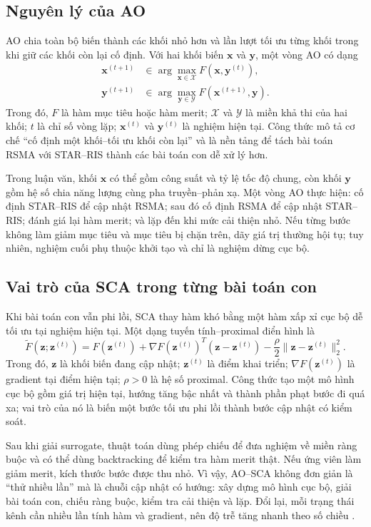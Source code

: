 \subsection{Nguyên lý của AO}
AO chia toàn bộ biến thành các khối nhỏ hơn và lần lượt tối ưu từng khối trong khi giữ các khối còn lại cố định. Với hai khối biến $\bm x$ và $\bm y$, một vòng AO có dạng
\begin{align}
 \bm x^{(t+1)}&\in\arg\max_{\bm x\in\mathcal X}F(\bm x,\bm y^{(t)}),\\
 \bm y^{(t+1)}&\in\arg\max_{\bm y\in\mathcal Y}F(\bm x^{(t+1)},\bm y).
 \label{eq:ch1-ao-update}
\end{align}
Trong đó, $F$ là hàm mục tiêu hoặc hàm merit; $\mathcal X$ và $\mathcal Y$ là miền khả thi của hai khối; $t$ là chỉ số vòng lặp; $\bm x^{(t)}$ và $\bm y^{(t)}$ là nghiệm hiện tại. Công thức mô tả cơ chế ``cố định một khối--tối ưu khối còn lại'' và là nền tảng để tách bài toán RSMA với STAR--RIS thành các bài toán con dễ xử lý hơn.

Trong luận văn, khối $\bm x$ có thể gồm công suất và tỷ lệ tốc độ chung, còn khối $\bm y$ gồm hệ số chia năng lượng cùng pha truyền--phản xạ. Một vòng AO thực hiện: cố định STAR--RIS để cập nhật RSMA; sau đó cố định RSMA để cập nhật STAR--RIS; đánh giá lại hàm merit; và lặp đến khi mức cải thiện nhỏ. Nếu từng bước không làm giảm mục tiêu và mục tiêu bị chặn trên, dãy giá trị thường hội tụ; tuy nhiên, nghiệm cuối phụ thuộc khởi tạo và chỉ là nghiệm dừng cục bộ.

\subsection{Vai trò của SCA trong từng bài toán con}
Khi bài toán con vẫn phi lồi, SCA thay hàm khó bằng một hàm xấp xỉ cục bộ dễ tối ưu tại nghiệm hiện tại. Một dạng tuyến tính--proximal điển hình là
\begin{equation}
 \widetilde F(\bm z;\bm z^{(t)})=F(\bm z^{(t)})+
 \nabla F(\bm z^{(t)})^T(\bm z-\bm z^{(t)})-
 \frac{\rho}{2}\|\bm z-\bm z^{(t)}\|_2^2.
 \label{eq:ch1-sca-surrogate}
\end{equation}
Trong đó, $\bm z$ là khối biến đang cập nhật; $\bm z^{(t)}$ là điểm khai triển; $\nabla F(\bm z^{(t)})$ là gradient tại điểm hiện tại; $\rho>0$ là hệ số proximal. Công thức tạo một mô hình cục bộ gồm giá trị hiện tại, hướng tăng bậc nhất và thành phần phạt bước đi quá xa; vai trò của nó là biến một bước tối ưu phi lồi thành bước cập nhật có kiểm soát.

Sau khi giải surrogate, thuật toán dùng phép chiếu để đưa nghiệm về miền ràng buộc và có thể dùng backtracking để kiểm tra hàm merit thật. Nếu ứng viên làm giảm merit, kích thước bước được thu nhỏ. Vì vậy, AO--SCA không đơn giản là ``thử nhiều lần'' mà là chuỗi cập nhật có hướng: xây dựng mô hình cục bộ, giải bài toán con, chiếu ràng buộc, kiểm tra cải thiện và lặp. Đổi lại, mỗi trạng thái kênh cần nhiều lần tính hàm và gradient, nên độ trễ tăng nhanh theo số chiều \cite{Scutari2017SCA}.

